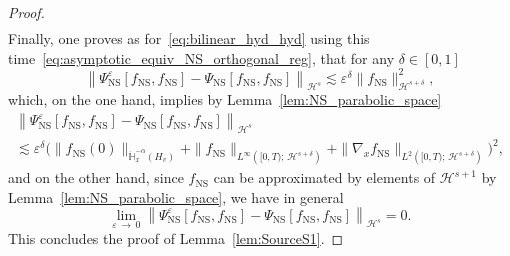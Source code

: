 \documentclass[AHL,Unicode,longabstracts,published]{cedram}
\newcommand{\ns}{\mathrm{NS}}
\newcommand{\bbH}{\mathbb{H}}
\newcommand{\HH}{\mathcal{H}}
\newcommand{\HHH}{\mathscr{H}}
\newcommand{\Ss}{H}
\newcommand{\rSSs}[1]{\HH^{#1}}
\newcommand{\rSSSs}[1]{\HHH^{#1}}
\newcommand*\eps{{\varepsilon}}
\begin{document}
\begin{proof}
\begin{multline*}
\end{multline*}
Finally, one proves as for~\eqref{eq:bilinear_hyd_hyd} using this time~\eqref{eq:asymptotic_equiv_NS_orthogonal_reg}, that for any $\delta \in [0, 1]$
\[
\left\| \Psi^\eps_\ns\left[f_\ns, f_\ns\right] - \Psi_\ns\left[f_\ns, f_\ns\right] \right\|_{ \rSSSs{s} } \lesssim \eps^{\delta} \| f_\ns \|_{\rSSSs{s+\delta}}^2,
\]
which, on the one hand, implies by Lemma~\ref{lem:NS_parabolic_space}
\begin{multline*}
\left\| \Psi^\eps_\ns \left[f_\ns, f_\ns\right] - \Psi_\ns\left[f_\ns, f_\ns\right] \right\|_{ \rSSSs{s} } \\
 \lesssim \eps^{\delta} \Big(\| f_\ns(0) \|_{ \dot{\bbH}^{-\alpha}_x \left(\Ss_v \right) } + \| f_\ns \|_{ L^\infty\left([0, T);\,\rSSs{s+\delta} \right) } + \| \nabla_x f_\ns \|_{ L^2\left([0, T);\,\rSSs{s+\delta} \right) }\Big)^2,
\end{multline*}
and on the other hand, since $f_\ns$ can be approximated by elements of $\rSSSs{s+1}$ by Lemma~\ref{lem:NS_parabolic_space}, we have in general
\[
\lim_{\eps\,\to\,0}\left\| \Psi^\eps_\ns\left[f_\ns, f_\ns\right] - \Psi_\ns\left[f_\ns, f_\ns\right] \right\|_{ \rSSSs{s} }=0.
\]
This concludes the proof of Lemma~\ref{lem:SourceS1}.
\end{proof}
\end{document}
